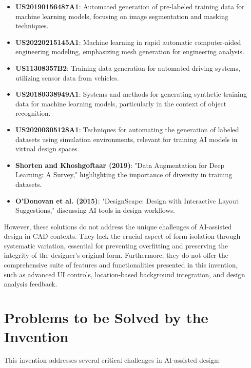 \documentclass{article}
\begin{document}
\begin{itemize}
    \item \textbf{US20190156487A1}: Automated generation of pre-labeled training data for machine learning models, focusing on image segmentation and masking techniques.
    \item \textbf{US20220215145A1}: Machine learning in rapid automatic computer-aided engineering modeling, emphasizing mesh generation for engineering analysis.
    \item \textbf{US11308357B2}: Training data generation for automated driving systems, utilizing sensor data from vehicles.
    \item \textbf{US20180338949A1}: Systems and methods for generating synthetic training data for machine learning models, particularly in the context of object recognition.
    \item \textbf{US20200305128A1}: Techniques for automating the generation of labeled datasets using simulation environments, relevant for training AI models in virtual design spaces.
    \item \textbf{Shorten and Khoshgoftaar (2019)}: "Data Augmentation for Deep Learning: A Survey," highlighting the importance of diversity in training datasets.
    \item \textbf{O'Donovan et al. (2015)}: "DesignScape: Design with Interactive Layout Suggestions," discussing AI tools in design workflows.
\end{itemize}

However, these solutions do not address the unique challenges of AI-assisted design in CAD contexts. They lack the crucial aspect of form isolation through systematic variation, essential for preventing overfitting and preserving the integrity of the designer's original form. Furthermore, they do not offer the comprehensive suite of features and functionalities presented in this invention, such as advanced UI controls, location-based background integration, and design analysis feedback.

\section{Problems to be Solved by the Invention}

This invention addresses several critical challenges in AI-assisted design:
\end{document}
